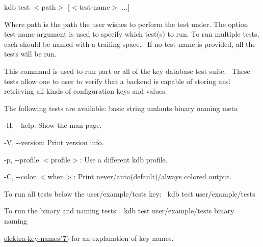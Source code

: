 {\ttfamily kdb test $<$path$>$ \mbox{[}$<$test-\/name$>$ ...\mbox{]}}~\newline


Where {\ttfamily path} is the path the user wishes to perform the test under. The option {\ttfamily test-\/name} argument is used to specify which test(s) to run. To run multiple tests, each should be named with a trailing space.~\newline
 If no {\ttfamily test-\/name} is provided, all the tests will be run.~\newline


This command is used to run part or all of the key database test suite.~\newline
 These tests allow one to user to verify that a backend is capable of storing and retrieving all kinds of configuration keys and values.~\newline


The following tests are available\+: basic string umlauts binary naming meta~\newline



\begin{DoxyItemize}
\item {\ttfamily -\/H}, {\ttfamily -\/-\/help}\+: Show the man page.
\item {\ttfamily -\/V}, {\ttfamily -\/-\/version}\+: Print version info.
\item {\ttfamily -\/p}, {\ttfamily -\/-\/profile $<$profile$>$}\+: Use a different kdb profile.
\item {\ttfamily -\/C}, {\ttfamily -\/-\/color $<$when$>$}\+: Print never/auto(default)/always colored output.
\end{DoxyItemize}

To run all tests below the {\ttfamily user/example/tests} key\+:~\newline
 {\ttfamily kdb test user/example/tests}~\newline


To run the {\ttfamily binary} and {\ttfamily naming} tests\+:~\newline
 {\ttfamily kdb test user/example/tests binary naming}~\newline



\begin{DoxyItemize}
\item \mbox{\hyperlink{doc_help_elektra-key-names_md}{elektra-\/key-\/names(7)}} for an explanation of key names. 
\end{DoxyItemize}